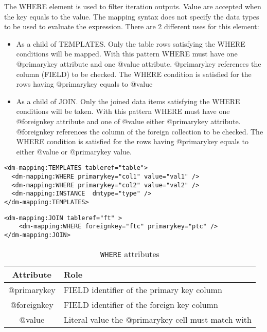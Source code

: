 The WHERE element is used to filter iteration outputs. Value are accepted when the key equals to the value. The mapping syntax does not specify the data types to be used to evaluate the expression. 
There  are 2 different uses for this element:
\begin{itemize}
    \item As a child of TEMPLATES. Only the table rows satisfying the WHERE conditions will be mapped. 
             With this pattern WHERE must have one @primarykey attribute and one @value attribute. 
              @primarykey references the column (FIELD) to be checked. 
             The WHERE condition is satisfied for the rows having @primarykey equals to @value
    \item As a child of JOIN. Only the joined data items satisfying the WHERE conditions will be taken. 
             With this pattern WHERE must have one @foreignkey attribute and one of @value either @primarykey attribute. 
              @foreignkey references the column of the foreign collection to be checked. 
             The WHERE condition is satisfied for the rows having @primarykey equals to either @value or @primarykey value.
\end{itemize}

\begin{lstlisting}[frame=single,caption={\texttt{WHERE} Example: only rows having val1 as col1 value and  val2 as col2 value are mapped},style=XML,basicstyle=\tiny]
<dm-mapping:TEMPLATES tableref="table">
  <dm-mapping:WHERE primarykey="col1" value="val1" />
  <dm-mapping:WHERE primarykey="col2" value="val2" />
  <dm-mapping:INSTANCE  dmtype="type" />
</dm-mapping:TEMPLATES>
\end{lstlisting}

\begin{lstlisting}[frame=single,caption={\texttt{WHERE} Example: the join is satisfied when the value of the ptc column  is equals to the ftc column of the foreign table },style=XML,basicstyle=\tiny]
<dm-mapping:JOIN tableref="ft" >
	<dm-mapping:WHERE foreignkey="ftc" primarykey="ptc" />
</dm-mapping:JOIN>
\end{lstlisting}

\begin{table}[!htbp]
\small
\centering
\begin{tabulary}{\linewidth}{|c|J|}       
       \hline 
            \textbf{Attribute} & 
            \textbf {Role}\\
       \hline         \hline  
            @primarykey& 
            FIELD identifier of the primary key column \\
        \hline 
            @foreignkey & 
            FIELD identifier of the foreign key column \\
        \hline 
            @value & 
            Literal value the  @primarykey cell must match with\\
        \hline 
     \end{tabulary}
     \caption{\texttt{WHERE} attributes} 
     \label{tbl:where-att}
 \end{table}

